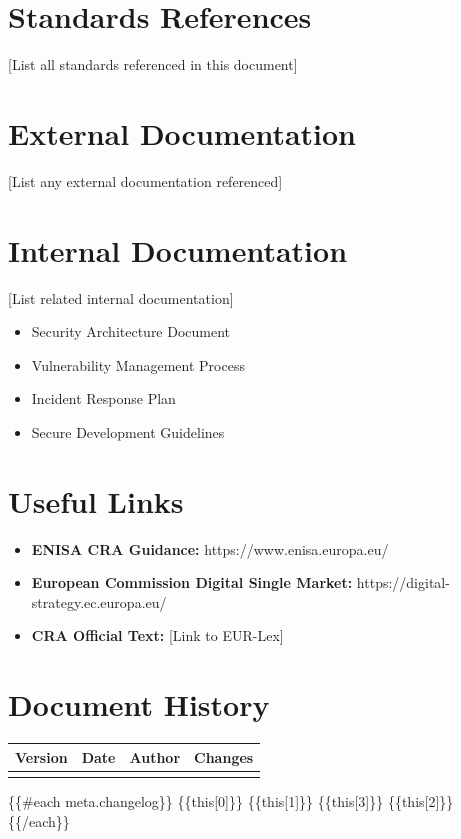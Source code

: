 \documentclass[
  11 pt,
  a4paper,
  table]{report}
\providecommand{\tightlist}{%
  \setlength{\itemsep}{0pt}\setlength{\parskip}{0pt}}\usepackage{longtable,booktabs,array}
\begin{document}
\section{Standards References}\label{standards-references}

{[}List all standards referenced in this document{]}

\section{External Documentation}\label{external-documentation}

{[}List any external documentation referenced{]}

\section{Internal Documentation}\label{internal-documentation}

{[}List related internal documentation{]}

\begin{itemize}
\tightlist
\item
  Security Architecture Document
\item
  Vulnerability Management Process
\item
  Incident Response Plan
\item
  Secure Development Guidelines
\end{itemize}

\section{Useful Links}\label{useful-links}

\begin{itemize}
\tightlist
\item
  \textbf{ENISA CRA Guidance:} https://www.enisa.europa.eu/
\item
  \textbf{European Commission Digital Single Market:}
  https://digital-strategy.ec.europa.eu/
\item
  \textbf{CRA Official Text:} {[}Link to EUR-Lex{]}
\end{itemize}

\section{Document History}\label{document-history}

\begin{longtable}[]{@{}llll@{}}
\toprule\noalign{}
Version & Date & Author & Changes \\
\midrule\noalign{}
\endhead
\bottomrule\noalign{}
\endlastfoot
\end{longtable}

\{\{\#each meta.changelog\}\} \textbar{} \{\{this{[}0{]}\}\} \textbar{}
\{\{this{[}1{]}\}\} \textbar{} \{\{this{[}3{]}\}\} \textbar{}
\{\{this{[}2{]}\}\} \textbar{} \{\{/each\}\}
\end{document}
